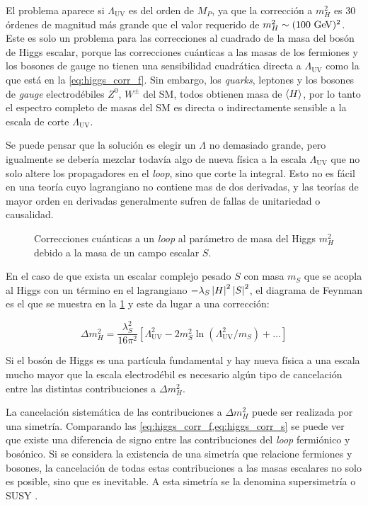 El problema aparece si $\Lambda_\text{UV}$ es del orden de $M_P$, ya que la
corrección a $m_H^2$ es 30 órdenes de magnitud más grande que el valor requerido
de $m_H^2 \sim (100 \gev)^2$. Este es solo un problema para las correcciones al
cuadrado de la masa del bosón de Higgs escalar, porque las correcciones
cuánticas a las masas de los fermiones y los bosones de gauge no tienen una
sensibilidad cuadrática directa a $\Lambda_\text{UV}$ como la que está en la
\cref{eq:higgs_corr_f}. Sin embargo, los \emph{quarks}, leptones y los bosones de \emph{gauge}
electrodébiles $Z^0$, $W^{\pm}$ del SM, todos obtienen masa de $\langle H \rangle$, por
lo tanto el espectro completo de masas del SM es directa o indirectamente
sensible a la escala de corte $\Lambda_\text{UV}$.

Se puede pensar que la solución es elegir un $\Lambda$ no demasiado grande, pero
igualmente se debería mezclar todavía algo de nueva física a la escala
$\Lambda_\text{UV}$ que no solo altere los propagadores en el \emph{loop}, sino que
corte la integral. Esto no es fácil en una teoría cuyo lagrangiano no contiene
mas de dos derivadas, y las teorías de mayor orden en derivadas generalmente
sufren de fallas de unitariedad o causalidad.

\begin{figure}[!htbp]
  \centering 
  \caption{Correcciones cuánticas a un \emph{loop} al parámetro de masa del Higgs
    $m_H^2$ debido a la masa de un campo escalar $S$.}
  \label{fig:higgs_correction_s}
\end{figure}

En el caso de que exista un escalar complejo pesado $S$ con masa $m_S$ que se
acopla al Higgs con un término en el lagrangiano $-\lambda_S \left| H \right|^2
\left| S \right|^2$, el diagrama de Feynman es el que se muestra en la
\cref{fig:higgs_correction_s} y este da lugar a una corrección:

\begin{equation}
  \Delta m_H^2 = \frac{\lambda_S^2}{16\pi^2} \left[ \Lambda^2_\text{UV} - 2
    m_S^2 \ln (\Lambda^2_\text{UV}/m_S) + \ldots \right]
  \label{eq:higgs_corr_s}
\end{equation}

Si el bosón de Higgs es una partícula fundamental y hay nueva física a una escala
mucho mayor que la escala electrodébil
es necesario algún tipo de cancelación entre las
distintas contribuciones a $\Delta m_H^2$.

La cancelación sistemática de las contribuciones a $\Delta m_H^2$ puede ser
realizada por una simetría. Comparando las
\cref{eq:higgs_corr_f,eq:higgs_corr_s} se puede ver que existe una diferencia de
signo entre las contribuciones del \emph{loop} fermiónico y bosónico. Si se
considera la existencia de una simetría que relacione fermiones y bosones, la
cancelación de todas estas contribuciones a las masas escalares no solo es
posible, sino que es inevitable. A esta simetría se la denomina supersimetría o
SUSY \cite{Martin:1997ns}.


